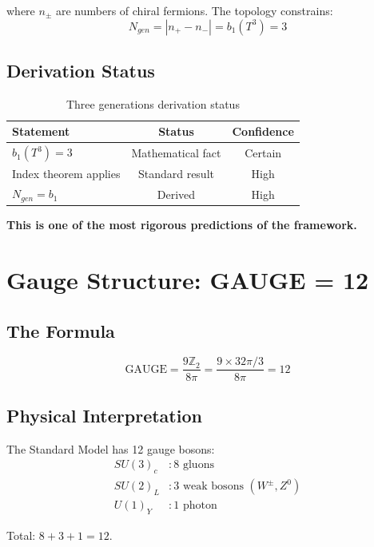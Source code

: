 \documentclass[12pt,a4paper]{article}
\begin{document}
where $n_\pm$ are numbers of chiral fermions. The topology constrains:
\begin{equation}
N_{gen} = |n_+ - n_-| = b_1(T^3) = 3
\end{equation}

\subsection{Derivation Status}

\begin{table}[h]
\centering
\begin{tabular}{lcc}
\toprule
Statement & Status & Confidence \\
\midrule
$b_1(T^3) = 3$ & Mathematical fact & Certain \\
Index theorem applies & Standard result & High \\
$N_{gen} = b_1$ & Derived & High \\
\bottomrule
\end{tabular}
\caption{Three generations derivation status}
\end{table}

\textbf{This is one of the most rigorous predictions of the framework.}

\section{Gauge Structure: GAUGE = 12}

\subsection{The Formula}

\begin{equation}
\text{GAUGE} = \frac{9\mathbb{Z}_2}{8\pi} = \frac{9 \times 32\pi/3}{8\pi} = 12
\end{equation}

\subsection{Physical Interpretation}

The Standard Model has 12 gauge bosons:
\begin{align}
SU(3)_c &: 8 \text{ gluons} \\
SU(2)_L &: 3 \text{ weak bosons } (W^\pm, Z^0) \\
U(1)_Y &: 1 \text{ photon}
\end{align}

Total: $8 + 3 + 1 = 12$.
\end{document}
